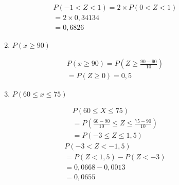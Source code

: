 \begin{description}
\begin{description}
\begin{enumerate}[label=(\alph*)]
         \begin{align*}
           P(-1 < Z < 1)  = 2 \times P(0<Z < 1) \\
           = 2 \times 0,34134 \\
           =0,6826
         \end{align*}

        \item $P(x \geq  90)$
 \begin{figure}[H]
            \centering
            
            \label{fig:}
          \end{figure}
          \begin{align*}
            P(x \geq 90) =P(Z \geq \frac{90-90}{10}) \\
            = P(Z \geq 0)=0,5
          \end{align*}

        \item $P(60 \leq x \leq 75 )$
 \begin{figure}[H]
\centering

\label{fig:}
\end{figure}
 \begin{figure}[H]
            \centering
            
            \label{fig:}
          \end{figure}


          \begin{align*}
            P(60 \leq X \leq 75 ) \\
            =P(\frac{60-90}{10} \leq Z \leq \frac{75-90}{10}) \\
            =P(-3 \leq Z \leq 1,5)
          \end{align*}
          \begin{align*}
            P(-3 < Z < -1,5)\\
            =P(Z <1,5)- P(Z< -3) \\
            =0,0668- 0,0013 \\
            =0,0655
          \end{align*}


\end{enumerate}
\end{description}
\end{description}
